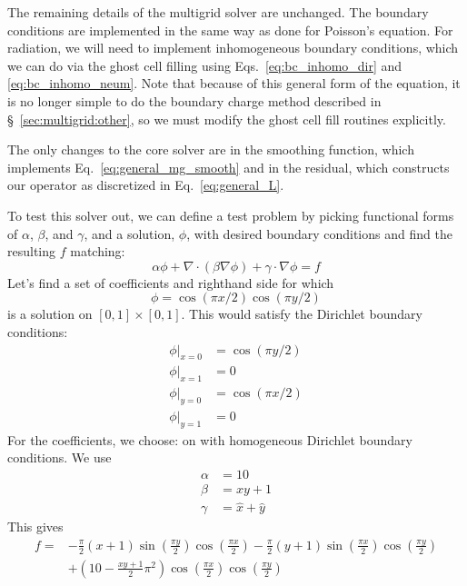 The remaining details of the multigrid solver are unchanged.  The boundary
conditions are implemented in the same way as done for Poisson's equation.
For radiation, we will need to implement inhomogeneous boundary conditions,
which we can do via the ghost cell filling using Eqs.~\ref{eq:bc_inhomo_dir}
and \ref{eq:bc_inhomo_neum}.  Note that because of this general form
of the equation, it is no longer simple to do the boundary charge method
described in \S~\ref{sec:multigrid:other}, so we must modify the ghost
cell fill routines explicitly.

The only changes to the core solver are in the smoothing function, which
implements Eq.~\ref{eq:general_mg_smooth} and in the residual, which
constructs our operator as discretized in Eq.~\ref{eq:general_L}.

To test this solver out, we can define a test problem by picking functional
forms of $\alpha$, $\beta$, and $\gamma$, and a solution, $\phi$, with
desired boundary conditions and find the resulting $f$ matching:
\begin{equation}
  \label{eq:general_elliptic}
\alpha \phi + \nabla \cdot (\beta \nabla \phi) + \gamma \cdot \nabla \phi = f
\end{equation}
Let's find a set of coefficients and righthand side for which
\begin{equation}
\phi = \cos(\pi x/2) \cos(\pi y/2)
\end{equation}
is a solution on $[0,1]\times[0,1]$.  This would satisfy the Dirichlet
boundary conditions:
\begin{align}
\phi |_{x=0} &= \cos(\pi y/2) \\
\phi |_{x=1} &= 0 \\
\phi |_{y=0} &= \cos(\pi x/2) \\
\phi |_{y=1} &= 0
\end{align}
For the coefficients, we choose:
on  with homogeneous Dirichlet boundary conditions.  We
use
\begin{align}
\alpha &= 10 \\
\beta  &= xy+1 \\
\gamma &= \hat{x} + \hat{y}
\end{align}
This gives
\begin{align}
  \label{eq:general_elliptic_rhs}
f = &- \frac{\pi}{2} (x + 1)
   \sin{\left (\frac{\pi y}{2} \right )} \cos{\left (\frac{\pi x}{2} \right )}
 - \frac{\pi}{2} (y + 1)
   \sin{\left (\frac{\pi x}{2} \right )} \cos{\left (\frac{\pi y}{2} \right )}
    \nonumber \\
   &+ \left(10- \frac{x y+1}{2} \pi^{2}\right)
    \cos{\left (\frac{\pi x}{2} \right )} \cos{\left (\frac{\pi y}{2} \right )}
\end{align}

